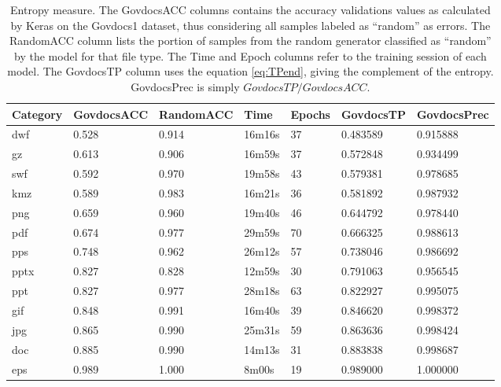 \begin{table}[!ht]
    \centering
    \caption[Entropy measure]{Entropy measure. The GovdocsACC columns contains the accuracy validations values as calculated by Keras on the Govdocs1 dataset, thus considering all samples labeled as ``random'' as errors. The RandomACC column lists the portion of samples from the random generator classified as ``random'' by the model for that file type. The Time and Epoch columns refer to the training session of each model. The GovdocsTP column uses the equation \ref{eq:TPend}, giving the complement of the entropy. GovdocsPrec is simply $GovdocsTP/GovdocsACC$.}
    \label{tab:pass1}
\begin{tabular}{|l|l|l|l|l|l|l|}
\hline
Category & GovdocsACC & RandomACC & Time   & Epochs & GovdocsTP & GovdocsPrec \\ \hline
dwf      & 0.528           & 0.914          & 16m16s & 37     & 0.483589  & 0.915888         \\ \hline
gz       & 0.613           & 0.906          & 16m59s & 37     & 0.572848  & 0.934499         \\ \hline
swf      & 0.592           & 0.970          & 19m58s & 43     & 0.579381  & 0.978685         \\ \hline
kmz      & 0.589           & 0.983          & 16m21s & 36     & 0.581892  & 0.987932         \\ \hline
png      & 0.659           & 0.960          & 19m40s & 46     & 0.644792  & 0.978440         \\ \hline
pdf      & 0.674           & 0.977          & 29m59s & 70     & 0.666325  & 0.988613         \\ \hline
pps      & 0.748           & 0.962          & 26m12s & 57     & 0.738046  & 0.986692         \\ \hline
pptx     & 0.827           & 0.828          & 12m59s & 30     & 0.791063  & 0.956545         \\ \hline
ppt      & 0.827           & 0.977          & 28m18s & 63     & 0.822927  & 0.995075         \\ \hline
gif      & 0.848           & 0.991          & 16m40s & 39     & 0.846620  & 0.998372         \\ \hline
jpg      & 0.865           & 0.990          & 25m31s & 59     & 0.863636  & 0.998424         \\ \hline
doc      & 0.885           & 0.990          & 14m13s & 31     & 0.883838  & 0.998687         \\ \hline
eps      & 0.989           & 1.000          & 8m00s  & 19     & 0.989000  & 1.000000         \\ \hline

\end{tabular}
\end{table}

